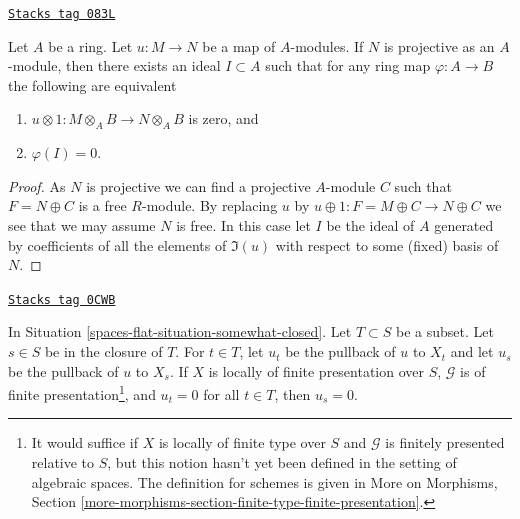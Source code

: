 \begin{lemma}
\label{spaces-flat-lemma-F-zero-module-map}
\href{https://stacks.math.columbia.edu/tag/083L}{\texttt{Stacks tag 083L}}

Let $A$ be a ring. Let $u : M \to N$ be a map of $A$-modules.
If $N$ is projective as an $A$-module, then there exists an ideal
$I \subset A$ such that for any ring map $\varphi : A \to B$
the following are equivalent
\begin{enumerate}
\item $u \otimes 1 : M \otimes_A B \to N \otimes_A B$ is zero, and
\item $\varphi(I) = 0$.
\end{enumerate}
\end{lemma}

\begin{proof}
As $N$ is projective we can find a projective $A$-module $C$
such that $F = N \oplus C$ is a free $R$-module.
By replacing $u$ by $u \oplus 1 : F = M \oplus C \to N \oplus C$
we see that we may assume $N$ is free. In this case let $I$ be
the ideal of $A$ generated by coefficients of all the elements of
$\Im(u)$ with respect to some (fixed) basis of $N$.
\end{proof}

\begin{lemma}
\label{spaces-flat-lemma-F-zero-somewhat-closed-points}
\href{https://stacks.math.columbia.edu/tag/0CWB}{\texttt{Stacks tag 0CWB}}

In Situation \ref{spaces-flat-situation-somewhat-closed}.
Let $T \subset S$ be a subset. Let $s \in S$ be in the closure of $T$.
For $t \in T$, let $u_t$ be the pullback of $u$ to $X_t$
and let $u_s$ be the pullback of $u$ to $X_s$.
If $X$ is locally of finite presentation over $S$,
$\mathcal{G}$ is of finite presentation\footnote{It would
suffice if $X$ is locally of finite type over $S$
and $\mathcal{G}$ is finitely presented relative to $S$,
but this notion hasn't yet been defined in the setting
of algebraic spaces. The definition for schemes is
given in More on Morphisms, Section
\ref{more-morphisms-section-finite-type-finite-presentation}.}, and
$u_t = 0$ for all $t \in T$, then $u_s = 0$.
\end{lemma}


